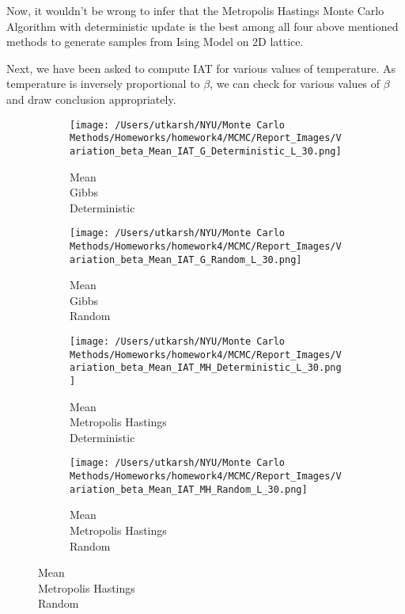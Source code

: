 \documentclass[11pt]{article}
\begin{document}
\par
\noindent Now, it wouldn't be wrong to infer that the Metropolis Hastings Monte Carlo Algorithm with deterministic update is the best among all four above mentioned methods to generate samples from Ising Model on 2D lattice.\\
\par
\noindent Next, we have been asked to compute IAT for various values of temperature. As temperature is inversely proportional to $\beta$, we can check for various values of $\beta$ and draw conclusion appropriately.



\begin{figure}[H]
	\centering
	\begin{subfigure}{.23\textwidth}
		\texttt{[image: /Users/utkarsh/NYU/Monte Carlo Methods/Homeworks/homework4/MCMC/Report\_Images/Variation\_beta\_Mean\_IAT\_G\_Deterministic\_L\_30.png]}
		\caption{Mean\\Gibbs\\Deterministic}
	\end{subfigure}
	\begin{subfigure}{.23\textwidth}
		\texttt{[image: /Users/utkarsh/NYU/Monte Carlo Methods/Homeworks/homework4/MCMC/Report\_Images/Variation\_beta\_Mean\_IAT\_G\_Random\_L\_30.png]}
		\caption{Mean\\Gibbs\\Random}
	\end{subfigure}
	\begin{subfigure}{.23\textwidth}
		\texttt{[image: /Users/utkarsh/NYU/Monte Carlo Methods/Homeworks/homework4/MCMC/Report\_Images/Variation\_beta\_Mean\_IAT\_MH\_Deterministic\_L\_30.png]}
		\caption{Mean\\Metropolis Hastings\\Deterministic}
	\end{subfigure}
	\begin{subfigure}{.23\textwidth}
		\texttt{[image: /Users/utkarsh/NYU/Monte Carlo Methods/Homeworks/homework4/MCMC/Report\_Images/Variation\_beta\_Mean\_IAT\_MH\_Random\_L\_30.png]}
		\caption{Mean\\Metropolis Hastings\\Random}
	\end{subfigure}


\end{figure}
\end{document}
